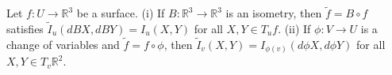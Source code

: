 Let $f: U \to \mathbb{R}^3$ be a surface.
(i) If $B: \mathbb{R}^3 \to \mathbb{R}^3$ is an isometry, then $\tilde{f} = B \circ f$ satisfies $\tilde{I}_u(dB X, dB Y) = I_u(X, Y)$ for all $X, Y \in T_u f$.
(ii) If $\phi: V \to U$ is a change of variables and $\tilde{f} = f \circ \phi$, then $\tilde{I}_v(X, Y) = I_{\phi(v)}(d\phi X, d\phi Y)$ for all $X, Y \in T_v \mathbb{R}^2$.